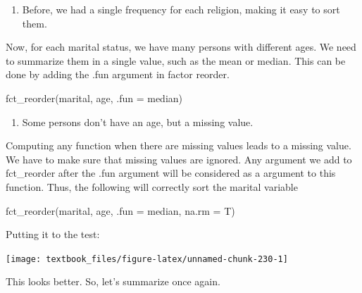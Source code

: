\documentclass[]{tufte-book}
\newenvironment{Shaded}{}{}
\newcommand{\DataTypeTok}[1]{\textcolor[rgb]{0.56,0.13,0.00}{#1}}
\newcommand{\KeywordTok}[1]{\textcolor[rgb]{0.00,0.44,0.13}{\textbf{#1}}}
\newcommand{\NormalTok}[1]{#1}
\newcommand{\OperatorTok}[1]{\textcolor[rgb]{0.40,0.40,0.40}{#1}}
\newcommand{\StringTok}[1]{\textcolor[rgb]{0.25,0.44,0.63}{#1}}
\providecommand{\tightlist}{%
  \setlength{\itemsep}{0pt}\setlength{\parskip}{0pt}}
\begin{document}
\begin{enumerate}
\def\labelenumi{\arabic{enumi}.}
\tightlist
\item
  Before, we had a single frequency for each religion, making it easy to sort them.
\end{enumerate}

Now, for each marital status, we have many persons with different ages. We need to summarize them in a single value, such as the mean or median. This can be done by adding the .fun argument in factor reorder.

fct\_reorder(marital, age, .fun = median)

\begin{enumerate}
\def\labelenumi{\arabic{enumi}.}
\setcounter{enumi}{1}
\tightlist
\item
  Some persons don't have an age, but a missing value.
\end{enumerate}

Computing any function when there are missing values leads to a missing value. We have to make sure that missing values are ignored. Any argument we add to fct\_reorder after the .fun argument will be considered as a argument to this function. Thus, the following will correctly sort the marital variable

fct\_reorder(marital, age, .fun = median, na.rm = T)

Putting it to the test:

\begin{Shaded}
\end{Shaded}

\texttt{[image: textbook\_files/figure-latex/unnamed-chunk-230-1]}

This looks better. So, let's summarize once again.
\end{document}
